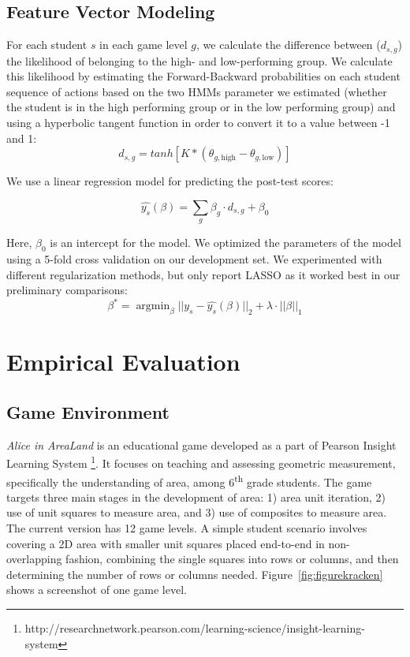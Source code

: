 \documentclass{sigchi}
\DeclareMathOperator*{\argmin}{argmin}
\begin{document}
\subsection{Feature Vector Modeling}

For each student $s$ in each game level $g$, we calculate the difference between ($d_{s,g}$) the likelihood of belonging to the high- and low-performing group.
We calculate this likelihood by estimating the Forward-Backward probabilities  on each student sequence of actions  based on the two HMMs parameter we estimated (whether the student is in the high performing group or in the low performing group) and using a hyperbolic tangent function in order to convert it to a value between -1 and 1: 
\begin{equation}
d_{s,g} = tanh[ K * (\theta_{g, \text{high}} - \theta_{g, \text{low}})]
\end{equation}

We use  a linear regression model for predicting the post-test scores:

\begin{equation}
\hat {y_s}(\beta) =   \sum_g \beta_g \cdot d_{s,g}  + \beta_0
\end{equation}

Here, $\beta_0$ is an intercept for the  model.  
We optimized the parameters of the model using a 5-fold cross validation on our development set.
We experimented with different regularization methods, but only report LASSO \cite{tibshirani1996regression} as it worked best in our preliminary comparisons:
\begin{equation}
\beta^* = \argmin_\beta || y_s - \hat{y_s}(\beta)  ||_2 + \lambda \cdot || \beta ||_1
\end{equation}


\section{Empirical Evaluation}

\subsection{Game Environment}
\textit {Alice in AreaLand} is an educational game developed as a part of Pearson Insight Learning System \footnote{http://researchnetwork.pearson.com/learning-science/insight-learning-system}. 
It focuses on teaching and assessing geometric measurement, specifically the understanding of area, among 6\textsuperscript{th} grade students. 
The game targets three main stages in the development of area: 1) area unit iteration, 2) use of unit squares to measure area, and 3) use of composites to measure area. 
The current version has 12 game levels. 
A simple student scenario involves covering a 2D area with smaller unit squares placed end-to-end in non-overlapping fashion, combining the single squares into rows or columns, and then determining the number of rows or columns needed. 
Figure~\ref{fig:figurekracken} shows a screenshot of one game level.
\end{document}
